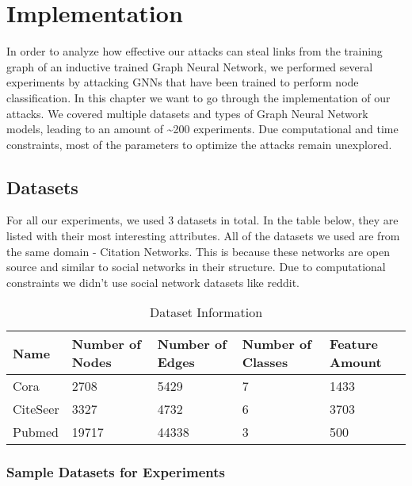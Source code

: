 \chapter{Implementation}

  In order to analyze how effective our attacks can steal links from the training graph of an inductive trained Graph Neural Network, we performed several experiments by attacking GNNs that have been trained to perform node classification.
  In this chapter we want to go through the implementation of our attacks.
  We covered multiple datasets and types of Graph Neural Network models, leading to an amount of \textasciitilde200 experiments.
  Due computational and time constraints, most of the parameters to optimize the attacks remain unexplored.

  \section{Datasets}
  \label{section:datasets}

    For all our experiments, we used 3 datasets in total.
    In the table below, they are listed with their most interesting attributes.
    All of the datasets we used are from the same domain - Citation Networks.
    This is because these networks are open source and similar to social networks in their structure.
    Due to computational constraints we didn't use social network datasets like reddit.

    \vspace{0.48cm}
    \begin{table}[!h]
      \centering
      \footnotesize
      \begin{tabular}{l|l|l|l|l}
        \toprule
        Name & Number of Nodes & Number of Edges & Number of Classes & Feature Amount \\
        \midrule
        Cora & 2708            & 5429            & 7                 & 1433 \\
        CiteSeer & 3327        & 4732            & 6                 & 3703 \\
        Pubmed & 19717         & 44338           & 3                 & 500 \\
        \bottomrule
      \end{tabular}
      \caption{Dataset Information}
      \label{table:datasets}
    \end{table}

    \subsection*{Sample Datasets for Experiments}
    \label{subsection:dataset-samples}

